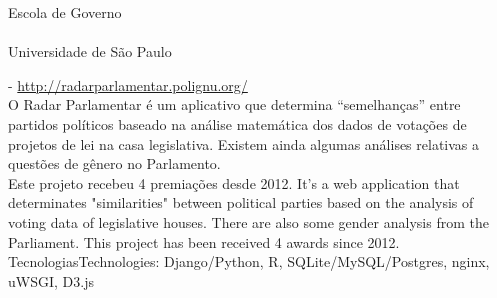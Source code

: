 \documentclass[]{friggeri-cv}
\begin{document}
\begin{entrylist}
    {}
    {Escola de Governo}
    {\\
     \\}
   \entry
    {}
    {}
    {Universidade de São Paulo}
    {}
\end{entrylist}
%
%
\textbf{} - \href{http://radarparlamentar.polignu.org/}{http://radarparlamentar.polignu.org/}\\
%
{O Radar Parlamentar é um aplicativo que determina ``semelhanças'' entre partidos \nohyphens{políticos} baseado na análise matemática dos dados de votações de projetos de lei na casa \nohyphens{legislativa}. Existem ainda algumas análises relativas a questões de gênero no Parlamento.\\
Este projeto recebeu 4 premiações desde 2012.}%
{It's a web application that determinates "similarities" between political parties based on the analysis of voting data of legislative houses. There are also some gender analysis from the Parliament. 
This project has been received 4 awards since 2012.}\\
%
{Tecnologias}{Technologies}: Django/Python, R, SQLite/MySQL/Postgres, nginx, uWSGI, D3.js
\end{document}
